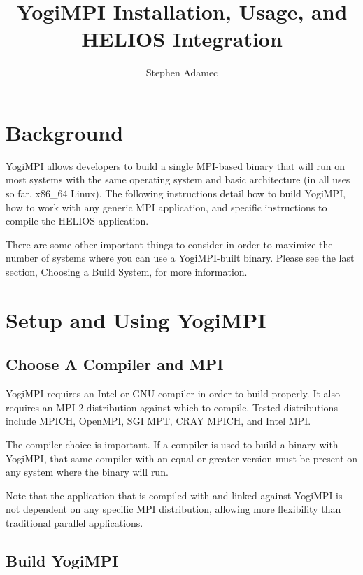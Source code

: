 \documentclass{article}
\begin{document}
\title{YogiMPI Installation, Usage, and HELIOS Integration}
\author{Stephen Adamec}

\maketitle

\section{Background}

YogiMPI allows developers to build a single MPI-based binary that will run on most systems with the same operating system and basic architecture (in all uses so far, x86\_64 Linux).  The following instructions detail how to build YogiMPI, how to work with any generic MPI application, and specific instructions to compile the HELIOS application.

There are some other important things to consider in order to maximize the number of systems where you can use a YogiMPI-built binary.  Please see the last section, Choosing a Build System, for more information.

\section{Setup and Using YogiMPI}

\subsection{Choose A Compiler and MPI}
YogiMPI requires an Intel or GNU compiler in order to build properly.  It also requires an MPI-2 distribution against which to compile.  Tested distributions include MPICH, OpenMPI, SGI MPT, CRAY MPICH, and Intel MPI.  

The compiler choice is important.  If a compiler is used to build a binary with YogiMPI, that same compiler with an equal or greater version must be present on any system where the binary will run.

Note that the application that is compiled with and linked against YogiMPI is not dependent on any specific MPI distribution, allowing more flexibility than traditional parallel applications.

\subsection{Build YogiMPI}
\end{document}
